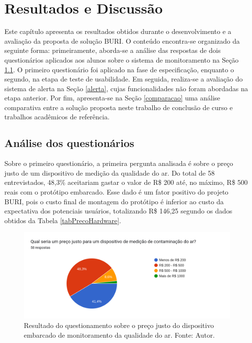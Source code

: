 \chapter{Resultados e Discussão}

Este capítulo apresenta os resultados obtidos durante o desenvolvimento e a avaliação da proposta de solução BURI. O conteúdo encontra-se 
organizado da seguinte forma: primeiramente, aborda-se a análise das respostas de dois questionários aplicados aos alunos sobre o sistema 
de monitoramento na Seção \ref{questionario}. O primeiro questionário foi aplicado na fase de especificação, enquanto o segundo, na etapa de teste de usabilidade. 
Em seguida, realiza-se a avaliação do sistema de alerta na Seção \ref{alerta}, cujas funcionalidades não foram abordadas na etapa anterior. Por fim, apresenta-se na Seção \ref{comparacao} uma análise comparativa 
entre a solução proposta neste trabalho de conclusão de curso e trabalhos acadêmicos de referência.

\section{Análise dos questionários}\label{questionario}

Sobre o primeiro questionário, a primeira pergunta analisada é sobre o preço justo de um dispositivo de medição da qualidade do ar. Do total de 58 entrevistados, 48,3\% 
aceitariam gastar o valor de R\$ 200 até, no máximo, R\$ 500 reais com o protótipo embarcado. Esse dado é um fator positivo do projeto BURI, pois o custo final de montagem do 
protótipo é inferior ao custo da expectativa dos potenciais usuários, totalizando R\$ 146,25 segundo os dados obtidos da Tabela \ref{tabPrecoHardware}.

\begin{figure}[ht]
    \centering
    \includegraphics[width=.64\textwidth]{img/questionario/1/graf-preco-hardware.png}
    \caption{Resultado do questionamento sobre o preço justo do dispositivo embarcado de monitoramento da qualidade do ar. Fonte: Autor.}\label{grafPrecoJusto}
\end{figure}

